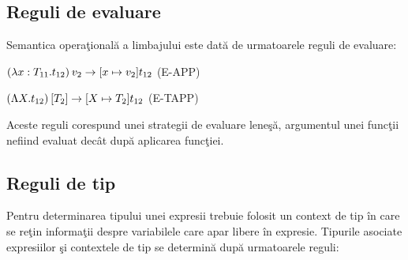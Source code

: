 \subsection{Reguli de evaluare}
\done{}
Semantica opera\c tional\u a a limbajului este dat\u a de urmatoarele reguli de evaluare:

\begin{multicols}{2}
\setlength\columnseprule{.4pt}

\begin{prooftree}
\end{prooftree}

$(\lambda x :T_{11} . t_{12})\app v_2 \to [x \mapsto v_2] t_{12}$ {\scriptsize (E-APP)}
\columnbreak

\begin{prooftree}
\end{prooftree}

$(\Lambda X . t_{12})\app [T_2] \to [X \mapsto T_2] t_{12}$ {\scriptsize(E-TAPP)}
\end{multicols}
Aceste reguli corespund unei strategii de evaluare lene\c s\u a, argumentul unei func\c tii nefiind evaluat dec\^ at dup\u a aplicarea func\c tiei. 

\subsection{Reguli de tip}

Pentru determinarea tipului unei expresii trebuie folosit un context de tip \^ in care se re\c tin in\-for\-ma\-\c ti\-i despre variabilele care apar libere \^ in expresie. Tipurile asociate expresiilor \c si contextele de tip se determin\u a dup\u a urmatoarele reguli:

